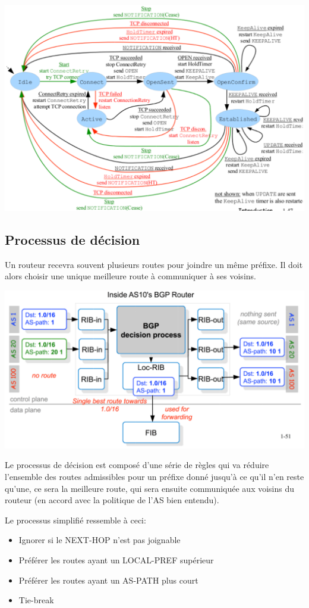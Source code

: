 \documentclass{article}
\begin{document}
\begin{sffamily}
\includegraphics[width=\textwidth]{fab_003.pdf}

\subsection{Processus de décision}

Un routeur recevra souvent plusieurs routes pour joindre un même
préfixe. Il doit alors choisir une unique meilleure route à
communiquer à ses voisins.

\includegraphics[width=\textwidth]{fab_004.pdf}

Le processus de décision est composé d'une série de règles qui va
réduire l'ensemble des routes admissibles pour un préfixe donné
jusqu'à ce qu'il n'en reste qu'une, ce sera la meilleure route, qui
sera ensuite communiquée aux voisins du routeur (en accord avec la
politique de l'AS bien entendu).

Le processus simplifié ressemble à ceci:

\begin{itemize}
\item Ignorer si le NEXT-HOP n'est pas joignable
\item Préférer les routes ayant un LOCAL-PREF supérieur
\item Préférer les routes ayant un AS-PATH plus court
\item Tie-break
\end{itemize}


\end{sffamily}
\end{document}
